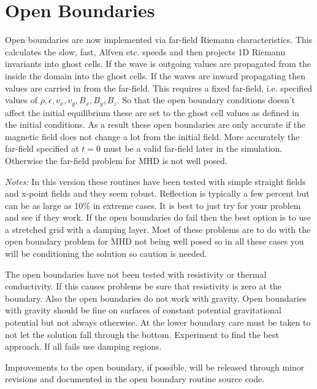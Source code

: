 \documentclass[11pt]{article}
\begin{document}

\section{Open  Boundaries} %
\label{sec:open_bcs}
Open boundaries are now implemented via far-field Riemann characteristics. This calculates the slow, fast, Alfven etc. 
speeds and then projects 1D Riemann invariants into ghost cells. If the wave is outgoing values are propagated from 
the inside the domain into the ghost cells. If the waves are inward propagating then values are carried in from the 
far-field. This requires a fixed far-field, i.e. specified values of $\rho, \epsilon, v_x, v_y, B_x, B_y, B_z$. So 
that the open boundary conditions doesn't affect the initial equilibrium these are set to the ghost cell values as 
defined in the initial conditions. As a result these open boundaries are only accurate if the magnetic field does 
not change a lot from the initial field. More accurately the far-field specified at $t=0$ must be a valid far-field 
later in the simulation. Otherwise the far-field problem for MHD is not well posed.

{\it Notes:} In this version these routines have been tested with simple straight fields and x-point fields and they 
seem robust. Reflection is typically a few percent but can be as large as 10\% in extreme cases. It is best to just 
try for your problem and see if they work. If the open boundaries do fail then the best option is to use a stretched 
grid with a damping layer. Most of these problems are to do with the open boundary problem for MHD not being well 
posed so in all these cases you will be conditioning the solution so caution is needed.

The open boundaries have not been tested with resistivity or thermal conductivity. If this causes problems 
be sure that resistivity is zero at the boundary. Also the open boundaries do not work with gravity. 
Open boundaries with gravity should be fine on surfaces of constant potential gravitational potential 
but not always otherwise. At the lower boundary care must be taken to not let the solution fall through 
the bottom. Experiment to find the best approach. If all fails use damping regions.

Improvements to the open boundary, if possible, will be released through minor revisions and documented 
in the open boundary routine source code.

\end{document}
